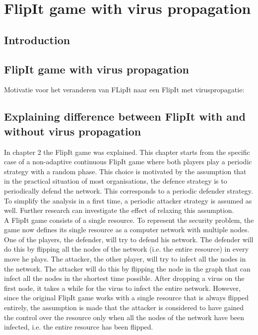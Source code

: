 \chapter{FlipIt game with virus propagation}
\label{cha:9}
%


\section{Introduction}

\section{FlipIt game with virus propagation}

Motivatie voor het veranderen van FLipIt naar een FlipIt met viruspropagatie:

\section{Explaining difference between FlipIt with and without virus propagation}

In chapter 2 the FlipIt game was explained.  This chapter starts from the specific case of a non-adaptive continuous FlipIt game where both players play a periodic strategy with a random phase. This choice is motivated by the assumption that in the practical situation of most organisations, the defence strategy is to periodically defend the network. This corresponds to a periodic defender strategy.  To simplify the analysis in a first time, a periodic attacker strategy is assumed as well. Further research can investigate the effect of relaxing this assumption.\\


A FlipIt game consists of a single resource. To represent the security problem, the game now defines its single resource as a computer network with multiple
nodes. One of the players, the defender, will try to defend his network. The defender
will do this by flipping all the nodes of the network (i.e. the entire resource) in every move he plays. The
attacker, the other player, will try to infect all the nodes in the network. The attacker
will do this by flipping the node in the graph that can infect all the nodes in the
shortest time possible. After dropping a virus on the first node, it takes a while for the virus to infect the entire network. However, since the original FlipIt game works with a single resource that is always flipped entirely, the assumption is made that the attacker is considered to have gained the control over the resource only when all the nodes of the network have been infected, i.e. the entire resource has been flipped.

